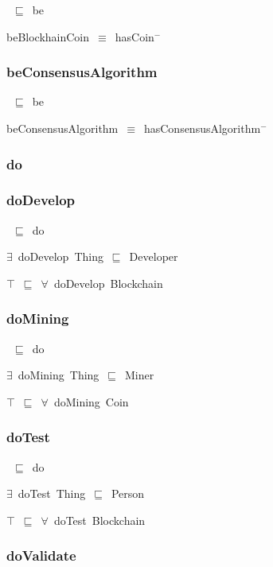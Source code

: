 \documentclass{article}
\begin{document}
~\ensuremath{\sqsubseteq}~be

beBlockhainCoin~\ensuremath{\equiv}~hasCoin\ensuremath{^-}

\subsubsection*{beConsensusAlgorithm}

~\ensuremath{\sqsubseteq}~be

beConsensusAlgorithm~\ensuremath{\equiv}~hasConsensusAlgorithm\ensuremath{^-}

\subsubsection*{do}

\subsubsection*{doDevelop}

~\ensuremath{\sqsubseteq}~do

\ensuremath{\exists}~doDevelop~Thing~\ensuremath{\sqsubseteq}~Developer

\ensuremath{\top}~\ensuremath{\sqsubseteq}~\ensuremath{\forall}~doDevelop~Blockchain

\subsubsection*{doMining}

~\ensuremath{\sqsubseteq}~do

\ensuremath{\exists}~doMining~Thing~\ensuremath{\sqsubseteq}~Miner

\ensuremath{\top}~\ensuremath{\sqsubseteq}~\ensuremath{\forall}~doMining~Coin

\subsubsection*{doTest}

~\ensuremath{\sqsubseteq}~do

\ensuremath{\exists}~doTest~Thing~\ensuremath{\sqsubseteq}~Person

\ensuremath{\top}~\ensuremath{\sqsubseteq}~\ensuremath{\forall}~doTest~Blockchain

\subsubsection*{doValidate}
\end{document}

